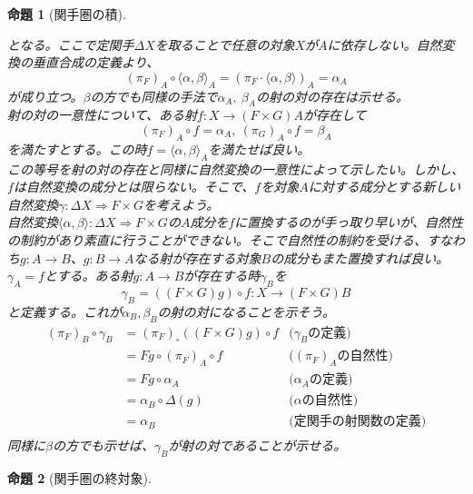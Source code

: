 \documentclass[uplatex,dvipdfmx]{jsarticle}
\newcommand{\arrow}{\rightarrow}
\newcommand{\nat}[3]{#1:#2\Rightarrow #3}
\newcommand{\tuple}[1]{\langle #1\rangle}
\newcommand{\mor}[3]{#1:#2\arrow #3}
\newtheorem{prop}{命題}[section]
\numberwithin{proof}{subsection}
\numberwithin{prop}{subsection}
\numberwithin{define}{subsection}
\begin{document}
\begin{prop}[関手圏の積]
\begin{center}
    \end{center}
    となる。ここで定関手$\varDelta X$を取ることで任意の対象$X$が$A$に依存しない。自然変換の垂直合成の定義より、\[(\pi_F)_A\circ\tuple{\alpha,\beta}_A=(\pi_F\cdot\tuple{\alpha,\beta})_A=\alpha_A\]が成り立つ。$\beta$の方でも同様の手法で$\alpha_A,\ \beta_A$の射の対の存在は示せる。\\
    射の対の一意性について、ある射$\mor{f}{X}{(F\times G)A}$が存在して\[(\pi_F)_A\circ f=\alpha_A,\ (\pi_G)_A\circ f=\beta_A\]を満たすとする。この時$f=\tuple{\alpha,\beta}_A$を満たせば良い。\\
    この等号を射の対の存在と同様に自然変換の一意性によって示したい。しかし、$f$は自然変換の成分とは限らない。そこで、$f$を対象$A$に対する成分とする新しい自然変換$\nat{\gamma}{\varDelta X}{F\times G}$を考えよう。\\
    自然変換$\nat{\tuple{\alpha,\beta}}{\varDelta X}{F\times G}$の$A$成分を$f$に置換するのが手っ取り早いが、自然性の制約があり素直に行うことができない。そこで自然性の制約を受ける、すなわち$\mor{g}{A}{B}$、$\mor{g}{B}{A}$なる射が存在する対象$B$の成分もまた置換すれば良い。
    $\gamma_A=f$とする。ある射$\mor{g}{A}{B}$が存在する時$\gamma_B$を\[\gamma_B = \mor{((F\times G)g)\circ f}{X}{(F\times G)B}\]と定義する。これが$\alpha_B,\beta_B$の射の対になることを示そう。\\
    \begin{align*}
      (\pi_F)_B\circ\gamma_B&=(\pi_F)_\circ((F\times G)g)\circ f&\text{($\gamma_B$の定義)}\\
      &=Fg\circ(\pi_F)_A\circ f&\text{($(\pi_F)_A$の自然性)}\\
      &=Fg\circ\alpha_A&\text{($\alpha_A$の定義)}\\
      &=\alpha_B\circ\varDelta(g)&\text{($\alpha$の自然性)}\\
      &=\alpha_B&\text{(定関手の射関数の定義)}\\
    \end{align*}
    同様に$\beta$の方でも示せば、$\gamma_B$が射の対であることが示せる。
  \end{prop}
  \begin{prop}[関手圏の終対象]
    
  \end{prop}
  
\end{document}
